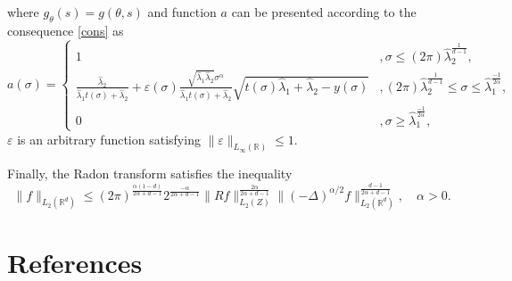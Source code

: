 \documentclass[12pt]{iopart}
\begin{document}
where $g_{\theta}(s)=g(\theta,s)$ and function $a$ can be presented according to the consequence \ref{cons} as
$$
a(\sigma)=
  \begin{cases}
    1& ,\sigma\le (2\pi)\widehat\lambda_2^\frac{1}{d-1},\\
    \frac{\widehat\lambda_2}{\widehat\lambda_1t(\sigma)+\widehat\lambda_2}+\varepsilon(\sigma)\frac{\sqrt{\widehat\lambda_1\widehat\lambda_2}\sigma^\alpha}{\widehat\lambda_1t(\sigma)+\widehat\lambda_2}\sqrt{t(\sigma)\widehat\lambda_1+\widehat\lambda_2-y(\sigma)}& ,(2\pi)\widehat\lambda_2^\frac{1}{d-1} \le\sigma\le\widehat\lambda_1^{\frac{-1}{2\alpha}},\\
    0 &,\sigma\ge\widehat\lambda_1^{\frac{-1}{2\alpha}},
  \end{cases}
$$
$\varepsilon$ is an arbitrary function satisfying $\|\varepsilon\|_{L_\infty(\mathbb R)}\le 1$.

Finally, the Radon transform satisfies the inequality
$$
\|f\|_{L_2(\mathbb R^d)}\leqslant
(2\pi)^{\frac{\alpha(1-d)}{2\alpha+d-1}}2^{\frac{-\alpha}{2\alpha+d-1}}\|Rf\|_{L_2(Z)}^{\frac{2\alpha}{2\alpha+d-1}}\|(-\Delta)^{\alpha/2}f\|_{L_2(\mathbb
  R^d)}^\frac{d-1}{2\alpha+d-1},\quad \alpha>0.
$$




\section*{References}

%

\end{document}
